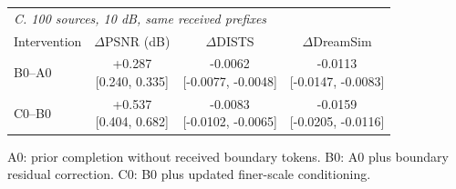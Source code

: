 \begin{table}[t]
\begin{tabular}{@{}lccc@{}}
\multicolumn{4}{l}{\textit{C. 100 sources, 10 dB, same received prefixes}}\\
Intervention & $\Delta$PSNR (dB) & $\Delta$DISTS & $\Delta$DreamSim\\
\midrule
B0--A0 & \shortstack{+0.287\\{}[0.240, 0.335]} & \shortstack{-0.0062\\{}[-0.0077, -0.0048]} & \shortstack{-0.0113\\{}[-0.0147, -0.0083]}\\[2pt]
C0--B0 & \shortstack{+0.537\\{}[0.404, 0.682]} & \shortstack{-0.0083\\{}[-0.0102, -0.0065]} & \shortstack{-0.0159\\{}[-0.0205, -0.0116]}\\[2pt]
\bottomrule\end{tabular}
\par\smallskip
\begin{minipage}{\columnwidth}\scriptsize
A0: prior completion without received boundary tokens. B0: A0 plus boundary residual correction. C0: B0 plus updated finer-scale conditioning.
\end{minipage}
\end{table}
